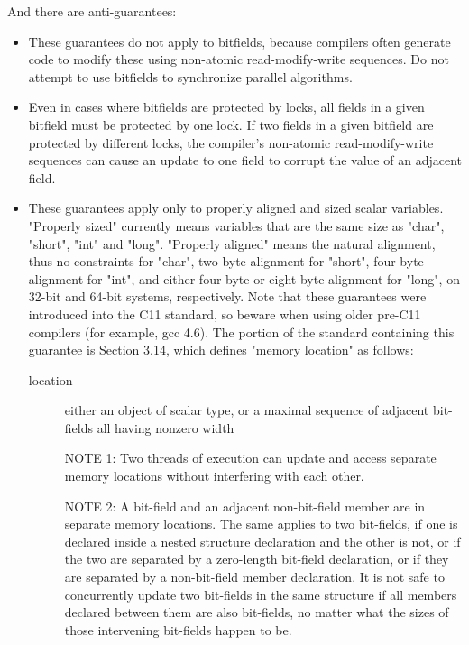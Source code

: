 And there are anti-guarantees:

\begin{itemize}
 \item These guarantees do not apply to bitfields, because compilers often
       generate code to modify these using non-atomic read-modify-write
       sequences.
       Do not attempt to use bitfields to synchronize parallel algorithms.

 \item Even in cases where bitfields are protected by locks, all fields
       in a given bitfield must be protected by one lock.
       If two fields in a given bitfield are protected by different locks,
       the compiler's non-atomic read-modify-write sequences can cause
       an update to one field to corrupt the value of an adjacent field.

 \item These guarantees apply only to properly aligned and sized scalar
       variables.
       "Properly sized" currently means variables that are the same size
       as "char", "short", "int" and "long".
       "Properly aligned" means the natural alignment, thus no
       constraints for "char", two-byte alignment for "short",
       four-byte alignment for "int", and either four-byte or eight-byte
       alignment for "long", on 32-bit and 64-bit systems, respectively.
       Note that these guarantees were introduced into the C11 standard,
       so beware when using older pre-C11 compilers (for example, gcc 4.6).
       The portion of the standard containing this guarantee is
       Section 3.14, which defines "memory location" as follows:

       \begin{description}
     	\item [location] \hfill
		either an object of scalar type, or a maximal sequence
		of adjacent bit-fields all having nonzero width

		NOTE 1: Two threads of execution can update and access
		separate memory locations without interfering with
		each other.

		NOTE 2: A bit-field and an adjacent non-bit-field member
		are in separate memory locations. The same applies
		to two bit-fields, if one is declared inside a nested
		structure declaration and the other is not, or if the two
		are separated by a zero-length bit-field declaration,
		or if they are separated by a non-bit-field member
		declaration. It is not safe to concurrently update two
		bit-fields in the same structure if all members declared
		between them are also bit-fields, no matter what the
		sizes of those intervening bit-fields happen to be.
       \end{description}
\end{itemize}

